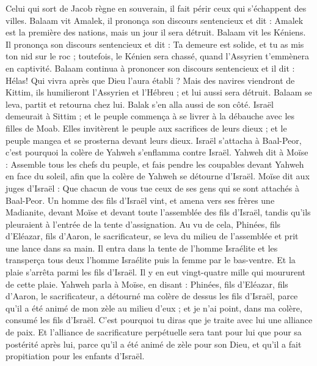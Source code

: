 \begin{multicols}{2}
Celui qui sort de Jacob règne en souverain, il fait périr ceux qui s'échappent des villes.
Balaam vit Amalek, il prononça son discours sentencieux et dit : Amalek est la première des nations, mais un jour il sera détruit.
Balaam vit les Kéniens. Il prononça son discours sentencieux et dit : Ta demeure est solide, et tu as mis ton nid sur le roc ;
toutefois, le Kénien sera chassé, quand l'Assyrien t'emmènera en captivité.
Balaam continua à prononcer son discours sentencieux et il dit : Hélas! Qui vivra après que Dieu l'aura établi ?
Mais des navires viendront de Kittim, ils humilieront l'Assyrien et l'Hébreu ; et lui aussi sera détruit.
Balaam se leva, partit et retourna chez lui. Balak s'en alla aussi de son côté.
\VerseOne{}Israël demeurait à Sittim ; et le peuple commença à se livrer à la débauche avec les filles de Moab.
Elles invitèrent le peuple aux sacrifices de leurs dieux ; et le peuple mangea et se prosterna devant leurs dieux.
Israël s'attacha à Baal-Peor, c'est pourquoi la colère de Yahweh s'enflamma contre Israël.
Yahweh dit à Moïse : Assemble tous les chefs du peuple, et fais pendre les coupables devant Yahweh en face du soleil, afin que la colère de Yahweh se détourne d'Israël.
Moïse dit aux juges d'Israël : Que chacun de vous tue ceux de ses gens qui se sont attachés à Baal-Peor.
Un homme des fils d'Israël vint, et amena vers ses frères une Madianite, devant Moïse et devant toute l'assemblée des fils d'Israël, tandis qu'ils pleuraient à l'entrée de la tente d'assignation.
Au vu de cela, Phinées, fils d'Eléazar, fils d'Aaron, le sacrificateur, se leva du milieu de l'assemblée et prit une lance dans sa main.
Il entra dans la tente de l'homme Israélite et les transperça tous deux l'homme Israélite puis la femme par le bas-ventre. Et la plaie s'arrêta parmi les fils d'Israël.
Il y en eut vingt-quatre mille qui moururent de cette plaie.
Yahweh parla à Moïse, en disant :
Phinées, fils d'Eléazar, fils d'Aaron, le sacrificateur, a détourné ma colère de dessus les fils d'Israël, parce qu'il a été animé de mon zèle au milieu d'eux ; et je n'ai point, dans ma colère, consumé les fils d'Israël.
C'est pourquoi tu diras que je traite avec lui une alliance de paix.
Et l'alliance de sacrificature perpétuelle sera tant pour lui que pour sa postérité après lui, parce qu'il a été animé de zèle pour son Dieu, et qu'il a fait propitiation pour les enfants d'Israël.

\end{multicols}
